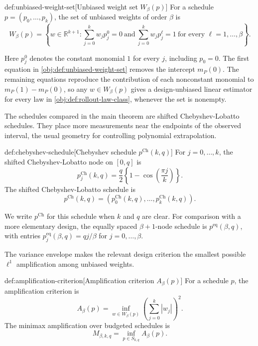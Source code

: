 \documentclass[11pt]{article}
\begin{document}
\begin{definitionv}{def:unbiased-weight-set}[Unbiased weight set $W_\beta(p)$]
For a schedule \(p=(p_0,\ldots,p_k)\), the set of unbiased weights of order \(\beta\) is
\[
W_\beta(p)
=
\left\{
w\in\mathbb R^{k+1}:
\sum_{j=0}^k w_j p_j^0=0
\ \text{and}\
\sum_{j=0}^k w_j p_j^\ell=1
\ \text{for every } \ell=1,\ldots,\beta
\right\}.
\]
\end{definitionv}

Here \(p_j^0\) denotes the constant monomial \(1\) for every \(j\), including \(p_0=0\). The first equation in \cref{obj:def:unbiased-weight-set} removes the intercept \(m_P(0)\). The remaining equations reproduce the contribution of each nonconstant monomial to \(m_P(1)-m_P(0)\), so any \(w\in W_\beta(p)\) gives a design-unbiased linear estimator for every law in \cref{obj:def:rollout-law-class}, whenever the set is nonempty.

The schedules compared in the main theorem are shifted Chebyshev-Lobatto schedules. They place more measurements near the endpoints of the observed interval, the usual geometry for controlling polynomial extrapolation.

\begin{definitionv}{def:chebyshev-schedule}[Chebyshev schedule \(p^{\mathrm{Ch}}(k,q)\)]
For \(j=0,\ldots,k\), the shifted Chebyshev-Lobatto node on \([0,q]\) is
\[
p^{\mathrm{Ch}}_j(k,q)
=
\frac{q}{2}\left\{1-\cos\left(\frac{\pi j}{k}\right)\right\}.
\]
The shifted Chebyshev-Lobatto schedule is
\[
p^{\mathrm{Ch}}(k,q)
=
\left(p^{\mathrm{Ch}}_0(k,q),\ldots,p^{\mathrm{Ch}}_k(k,q)\right).
\]
\end{definitionv}

We write \(p^{\mathrm{Ch}}\) for this schedule when \(k\) and \(q\) are clear. For comparison with a more elementary design, the equally spaced \(\beta+1\)-node schedule is \(p^{\mathrm{eq}}(\beta,q)\), with entries \(p^{\mathrm{eq}}_j(\beta,q)=qj/\beta\) for \(j=0,\ldots,\beta\).

The variance envelope makes the relevant design criterion the smallest possible \(\ell^1\) amplification among unbiased weights.

\begin{definitionv}{def:amplification-criterion}[Amplification criterion \(A_\beta(p)\)]
For a schedule \(p\), the amplification criterion is
\[
A_\beta(p)
=
\inf_{w\in W_\beta(p)}
\left(\sum_{j=0}^k |w_j|\right)^2.
\]
The minimax amplification over budgeted schedules is
\[
M_{\beta,k,q}
=
\inf_{p\in S_{k,q}} A_\beta(p).
\]
\end{definitionv}
\end{document}
